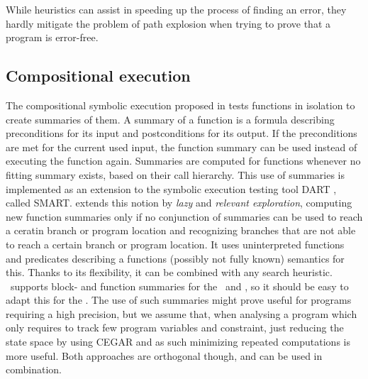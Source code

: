 While heuristics can assist in speeding up the process of finding an error, they hardly mitigate the problem of path explosion when trying to prove that a program is error-free.
\subsection*{Compositional execution}
The compositional symbolic execution proposed in \cite{Godefroid2007} tests functions in isolation to create summaries of them.
A summary of a function is a formula describing preconditions for its input and postconditions for its output.
If the preconditions are met for the current used input, the function summary can be used instead of executing the function again.
Summaries are computed for functions whenever no fitting summary exists, based on their call hierarchy.
This use of summaries is implemented as an extension to the symbolic execution testing tool DART \cite{Godefroid2005}, called SMART.
\cite{Anand2008} extends this notion by \emph{lazy} and \emph{relevant exploration}, computing new function summaries only if no conjunction of summaries can be used to reach a ceratin branch or program location and
recognizing branches that are not able to reach a certain branch or program location.
It uses uninterpreted functions and predicates describing a functions (possibly not fully known) semantics for this.
Thanks to its flexibility, it can be combined with any search heuristic.
\CpaChecker\ supports block- and function summaries for the \predicateCPA\ and , so it should be easy to adapt this for the \symbolicExecutionCPA.
The use of such summaries might prove useful for programs requiring a high precision, but we assume that, when analysing a program which only requires to track few program variables and constraint, just reducing the state space by using CEGAR and as such minimizing repeated computations is more useful.
Both approaches are orthogonal though, and can be used in combination.

